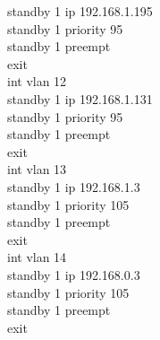 \documentclass[12pt, a4paper]{article}
\begin{document}
\begin{flushleft}
\begin{tcolorbox}
			standby 1 ip 192.168.1.195\\
			standby 1 priority 95\\
			standby 1 preempt\\
			exit\\
			int vlan 12\\
			standby 1 ip 192.168.1.131\\
			standby 1 priority 95\\
			standby 1 preempt\\
			exit\\
			int vlan 13\\
			standby 1 ip 192.168.1.3\\
			standby 1 priority 105\\
			standby 1 preempt\\
			exit\\
			int vlan 14\\
			standby 1 ip 192.168.0.3\\
			standby 1 priority 105\\
			standby 1 preempt\\
			exit
		\end{tcolorbox}
	\end{flushleft}
\end{document}
